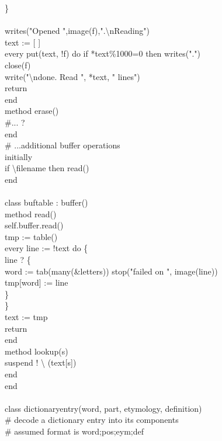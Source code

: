 {\>\>\>	 \} \\
\ \\
\>\>      writes("Opened ",image(f),".{\textbackslash}nReading") \\
\>\>      text := [ ] \\
\>\>      every put(text, !f) do if *text\%1000=0 then writes(".") \\
\>\>      close(f) \\
\>\>      write("{\textbackslash}ndone.  Read ", *text, " lines") \\
\>\>      return \\
\>   end \\
\>   method erase() \\
\>\>      \#... ? \\
\>   end \\
\>   \# ...additional buffer operations \\
initially \\
\>   if {\textbackslash}filename then read() \\
end \\
\ \\
class buftable : buffer() \\
\>   method read() \\
\>\>      self.buffer.read() \\
\>\>      tmp := table() \\
\>\>      every line := !text do \{ \\
\>\>\>	 line ? \{ \\
\>\>\>\>	    word := tab(many(\&letters)) {\textbar} stop("failed on ",
	    image(line)) \\
\>\>\>\>	    tmp[word] := line \\
\>\>\>\>	    \} \\
\>\>\>	 \} \\
\>\>      text := tmp \\
\>\>      return \\
\>   end \\
\>   method lookup(s) \\
\>\>      suspend ! {\textbackslash} (text[s]) \\
\>   end \\
end \\
\ \\
class dictionaryentry(word, part, etymology, definition) \\
\>   \# decode a dictionary entry into its components \\
\>   \# assumed format is word;pos;eym;def \\
}
